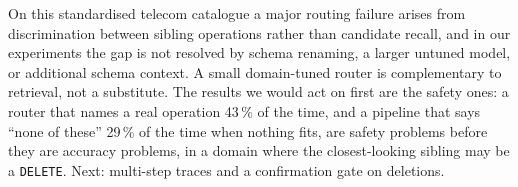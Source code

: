 On this standardised telecom catalogue a major routing failure arises from
discrimination between sibling operations rather than candidate recall, and in
our experiments the gap is not resolved by schema renaming, a larger untuned
model, or additional schema context. A small domain-tuned router is complementary to retrieval, not a substitute. The results we would act on first are the safety ones: a router that names a
real operation 43\,\% of the time, and a pipeline that says ``none of these''
29\,\% of the time when nothing fits, are safety problems before they are
accuracy problems, in a domain where the closest-looking sibling may be a
\texttt{DELETE}\@.
Next: multi-step traces and a confirmation gate on deletions.
